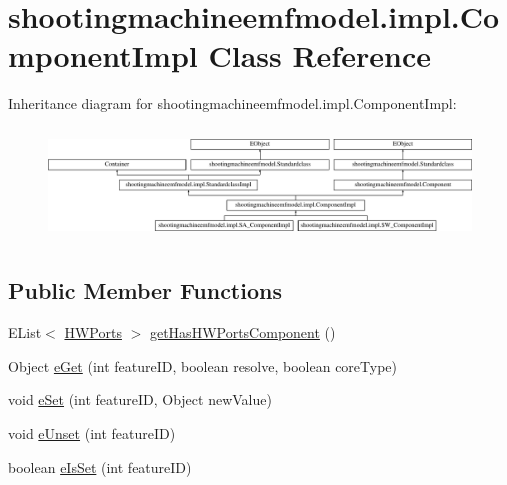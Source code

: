 \hypertarget{classshootingmachineemfmodel_1_1impl_1_1_component_impl}{\section{shootingmachineemfmodel.\-impl.\-Component\-Impl Class Reference}
\label{classshootingmachineemfmodel_1_1impl_1_1_component_impl}
}
Inheritance diagram for shootingmachineemfmodel.\-impl.\-Component\-Impl\-:\begin{figure}[H]
\begin{center}
\leavevmode
\includegraphics[height=3.030303cm]{classshootingmachineemfmodel_1_1impl_1_1_component_impl}
\end{center}
\end{figure}
\subsection*{Public Member Functions}
\begin{DoxyCompactItemize}
\item 
E\-List$<$ \hyperlink{interfaceshootingmachineemfmodel_1_1_h_w_ports}{H\-W\-Ports} $>$ \hyperlink{classshootingmachineemfmodel_1_1impl_1_1_component_impl_a278ec36c9c5c095e447ab6623e7c5900}{get\-Has\-H\-W\-Ports\-Component} ()
\item 
Object \hyperlink{classshootingmachineemfmodel_1_1impl_1_1_component_impl_a1955f2b649b9822c6890341985b29815}{e\-Get} (int feature\-I\-D, boolean resolve, boolean core\-Type)
\item 
void \hyperlink{classshootingmachineemfmodel_1_1impl_1_1_component_impl_a04fd3e10cdac690caa59413d68681c25}{e\-Set} (int feature\-I\-D, Object new\-Value)
\item 
void \hyperlink{classshootingmachineemfmodel_1_1impl_1_1_component_impl_a4cc7cdf285baf25f22f22334df954c80}{e\-Unset} (int feature\-I\-D)
\item 
boolean \hyperlink{classshootingmachineemfmodel_1_1impl_1_1_component_impl_a92135445c354e434145c7ff762b3d977}{e\-Is\-Set} (int feature\-I\-D)
\end{DoxyCompactItemize}
